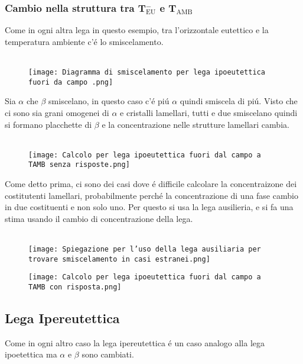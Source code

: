 \documentclass{article}
\begin{document}
{            \subsubsection{Cambio nella struttura tra T$^-_\text{EU}$ e T$_\text{AMB}$}
                Come in ogni altra lega in questo esempio, tra l'orizzontale eutettico e la temperatura ambiente c'\'e lo smiscelamento.\\ \\
                \begin{figure}[h!]
                    \centering
                    \texttt{[image: Diagramma di smiscelamento per lega ipoeutettica fuori da campo .png]}
                \end{figure}
                Sia $\alpha$ che $\beta$ smiscelano, in questo caso c'\'e pi\'u $\alpha$ quindi smiscela di pi\'u. Visto che ci sono sia grani omogenei di $\alpha$ e cristalli lamellari, tutti e due smiscelano quindi si formano placchette di $\beta$ e la concentrazione nelle strutture lamellari cambia.\\ \\
                \begin{figure}[h!]
                    \centering
                    \texttt{[image: Calcolo per lega ipoeutettica fuori dal campo a TAMB senza risposte.png]}
                \end{figure}
                Come detto prima, ci sono dei casi dove \'e difficile calcolare la concentraizone dei costitutenti lamellari, probabilmente perch\'e la concentrazione di una fase cambio in due costituenti e non solo uno. Per questo si usa la lega ausilieria, e si fa una stima usando il cambio di concentrazione della lega.\\ \\
                \begin{figure}[h!]
                    \centering
                    \texttt{[image: Spiegazione per l'uso della lega ausiliaria per trovare smiscelamento in casi estranei.png]}
                \end{figure}
                \begin{figure}[h!]
                    \centering
                    \texttt{[image: Calcolo per lega ipoeutettica fuori dal campo a TAMB con risposta.png]}
                \end{figure}
        \subsection{Lega Ipereutettica}
            Come in ogni altro caso la lega ipereutettica \'e un caso analogo alla lega ipoetettica ma $\alpha$ e $\beta$ sono cambiati.
}
\end{document}
